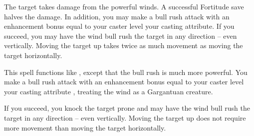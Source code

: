 \spellrng{\rngmed}
\begin{spelleffect}
  The target takes damage from the powerful winds. A successful Fortitude save halves the damage. In addition, you may make a bull rush attack with an enhancement bonus equal to your caster level \add your casting attribute. If you succeed, you may have the wind bull rush the target in any direction -- even vertically. Moving the target up takes twice as much movement as moving the target horizontally.
\end{spelleffect}

\begin{spelleffect}
  This spell functions like , except that the bull rush is much more powerful. You make a bull rush attack with an enhancement bonus equal to your caster level \add your casting attribute , treating the wind as a Gargantuan creature.
  
  If you succeed, you knock the target prone and may have the wind bull rush the target in any direction -- even vertically. Moving the target up does not require more movement than moving the target horizontally.
\end{spelleffect}

